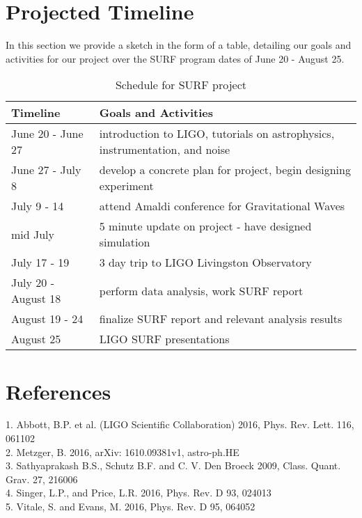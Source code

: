 \documentclass{article}
\begin{document}
\section{Projected Timeline}
In this section we provide a sketch in the form of a table, detailing our goals and activities for our project over the SURF program dates of June 20 - August 25. \\

\begin{table} [ht]
\caption{Schedule for SURF project}
\begin{tabular}{ p{3cm} p{10cm} }
 \hline
\centering Timeline & Goals and Activities \\ [0.5ex] 
 \hline
 \hline
June 20 - June 27 & introduction to LIGO, tutorials on astrophysics, instrumentation, and noise \\
June 27 - July 8 & develop a concrete plan for project, begin designing experiment \\
July 9 - 14 & attend Amaldi conference for Gravitational Waves \\
mid July & 5 minute update on project - have designed simulation \\
July 17 - 19 & 3 day trip to LIGO Livingston Observatory \\
July 20 - August 18 & perform data analysis, work SURF report \\
August 19 - 24 & finalize SURF report and relevant analysis results \\  
August 25 & LIGO SURF presentations \\
 \hline
\end{tabular}
\end{table}

\section{References}

1.  Abbott, B.P. et al. (LIGO Scientific Collaboration) 2016, Phys. Rev. Lett. 116, 061102 \\
2.  Metzger, B. 2016, arXiv: 1610.09381v1, astro-ph.HE \\
3.  Sathyaprakash B.S., Schutz B.F. and C. V. Den Broeck 2009, Class. Quant. Grav. 27, 216006 \\
4.  Singer, L.P., and Price, L.R. 2016, Phys. Rev. D 93, 024013 \\
5.  Vitale, S. and Evans, M. 2016, Phys. Rev. D 95, 064052 \\
  
\end{document}
